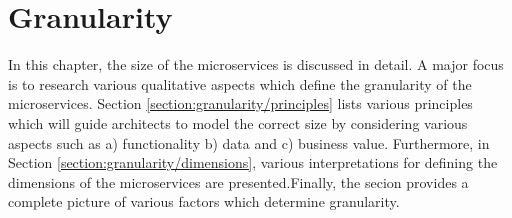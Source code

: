 \chapter{Granularity}\label{chapter:granularity}
In this chapter, the size of the microservices is discussed in detail. A major focus is to research various qualitative aspects which define the granularity of the microservices. Section \ref{section:granularity/principles} lists various principles which will guide architects to model the correct size by considering various aspects such as a) functionality b) data and c) business value. Furthermore, in Section \ref{section:granularity/dimensions}, various interpretations for defining the dimensions of the microservices are presented.Finally, the secion provides a complete picture of various factors which determine granularity.

